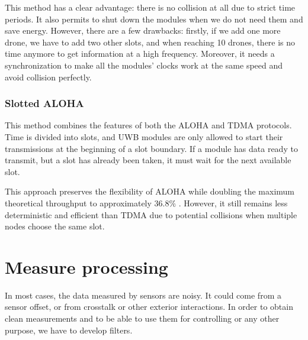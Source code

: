 \noindent This method has a clear advantage: there is no collision at all due to strict time periods. It also permits to shut down the modules when we do not need them and save energy. However, there are a few drawbacks: firstly, if we add one more drone, we have to add two other slots, and when reaching 10 drones, there is no time anymore to get information at a high frequency. Moreover, it needs a synchronization to make all the modules' clocks work at the same speed and avoid collision perfectly.

\subsubsection{Slotted ALOHA}

This method combines the features of both the ALOHA and TDMA protocols. Time is divided into slots, and UWB modules are only allowed to start their transmissions at the beginning of a slot boundary. If a module has data ready to transmit, but a slot has already been taken, it must wait for the next available slot.

This approach preserves the flexibility of ALOHA while doubling the maximum theoretical throughput to approximately $36.8\%$ \cite{noauthor_pdf_2026}. However, it still remains less deterministic and efficient than TDMA due to potential collisions when multiple nodes choose the same slot.
\newpage
\section{Measure processing}

In most cases, the data measured by sensors are noisy. It could come from a sensor offset, or from crosstalk or other exterior interactions. In order to obtain clean measurements and to be able to use them for controlling or any other purpose, we have to develop  filters.

